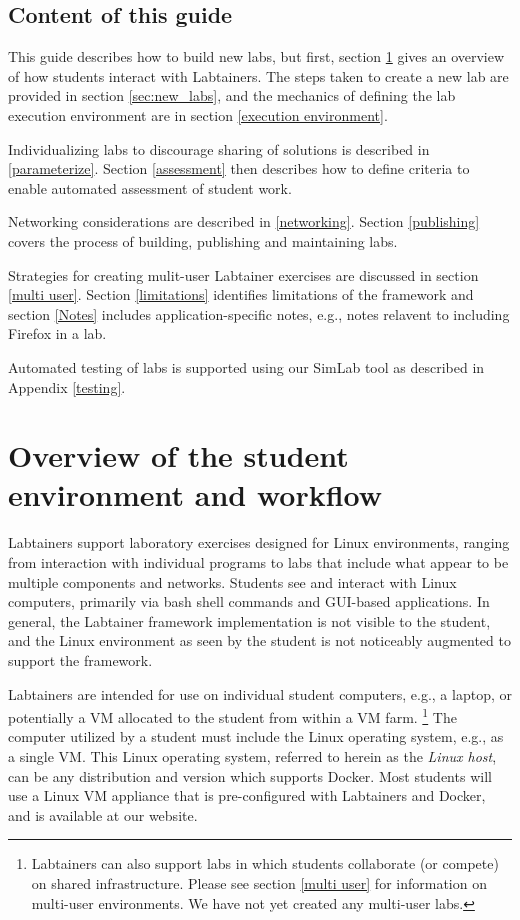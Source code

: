 \documentclass[12pt]{article}
\begin{document}
\subsection{Content of this guide}
This guide describes how to build new labs, but first, section \ref{student environment}
gives an overview of how students interact with Labtainers.  The steps taken to
create a new lab are provided in section \ref{sec:new_labs}, and the mechanics of defining
the lab execution environment are in section \ref{execution environment}.

Individualizing labs to discourage sharing of solutions is described in \ref{parameterize}.
Section \ref{assessment} then describes how to define criteria to enable automated assessment
of student work.  

Networking considerations are described in \ref{networking}.  Section \ref{publishing} covers
the process of building, publishing and maintaining labs.

Strategies for creating mulit-user Labtainer exercises are discussed in section \ref{multi user}.
Section \ref{limitations} identifies limitations of the framework and section \ref{Notes} includes
application-specific notes, e.g., notes relavent to including Firefox in a lab.

Automated testing of labs is supported using our SimLab tool as described in Appendix \ref{testing}.


\section {Overview of the student environment and workflow}
\label{student environment}
Labtainers support laboratory exercises designed for Linux environments,
ranging from interaction with individual programs to labs that include
what appear to be multiple components and networks.  Students see and interact with Linux
computers, primarily via bash shell commands and GUI-based applications. In general, the Labtainer
framework implementation is not visible to the student, and the Linux
environment as seen by the student is not noticeably augmented to support the framework.

Labtainers are intended for use on individual student computers, e.g., a laptop,
or potentially a VM allocated to the student from within a VM farm. \footnote{Labtainers
can also support labs in which students collaborate (or compete) on shared infrastructure.
Please see section \ref{multi user} for information on multi-user environments. We have not yet
created any multi-user labs.}
The computer utilized by a student must include the Linux operating system, e.g.,
as a single VM.  This Linux operating system, referred to herein
as the \textit{Linux host}, can be any distribution and version
which supports Docker.  Most students will use a Linux VM appliance
that is pre-configured with Labtainers and Docker, and is available at our website.
\end{document}

